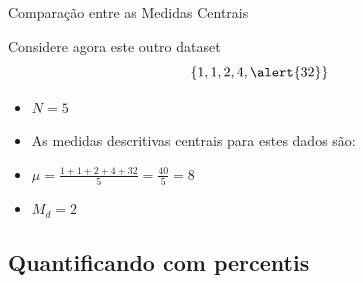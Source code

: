 \documentclass{beamer}
\begin{document}
\begin{frame}{Comparação entre as Medidas Centrais}
  \begin{example}Considere agora este outro dataset $$\{
    1,1,2,4,\alert{32} \}$$
  \begin{itemize}
  \item $N=5$
  \item As medidas descritivas centrais para estes dados são:
  \item $\mu = \frac{1+1+2+4+32}{5} = \frac{40}{5}= 8$
  \item $M_d = 2$
  \end{itemize}
\end{example}
\end{frame}

\subsection{Quantificando com percentis}
\end{document}
